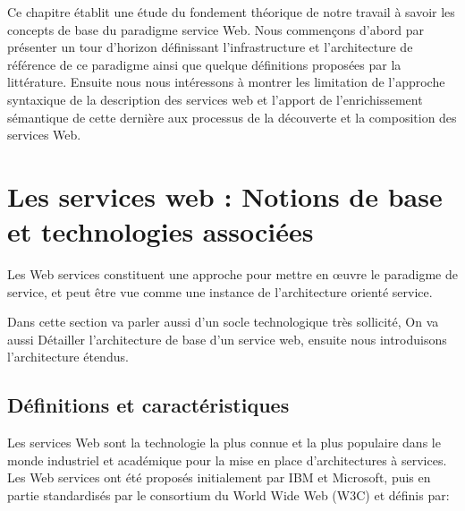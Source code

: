 

    Ce chapitre établit une étude du fondement théorique de notre travail à savoir les concepts de base du paradigme
    service Web.  Nous commençons d'abord par présenter un tour d'horizon définissant l'infrastructure et
    l'architecture de référence de ce paradigme ainsi que quelque définitions proposées par la littérature. Ensuite
    nous nous intéressons à montrer les limitation de l'approche syntaxique de la description des services web et l'apport
    de l'enrichissement sémantique de cette dernière aux processus de la découverte et la composition des services Web.\\

    \newpage
    
\section{Les services web : Notions de base et technologies associées} 
    Les Web services constituent une approche pour mettre en œuvre le paradigme de service, et peut être vue comme
    une instance de l'architecture orienté service.

    Dans cette section va parler aussi d'un socle technologique très sollicité, On va aussi Détailler l'architecture de base 
    d'un service web, ensuite nous introduisons l'architecture étendus.

    \subsection{Définitions et caractéristiques}
	Les services Web sont la technologie la plus connue et la plus populaire dans le monde industriel et
	académique pour la mise en place d’architectures à services. Les Web services ont été proposés initialement par
	IBM et Microsoft, puis en partie standardisés par le consortium du World Wide Web (W3C) et définis
       	\cite{w3c_ws_arch:2014:Misc} par:

